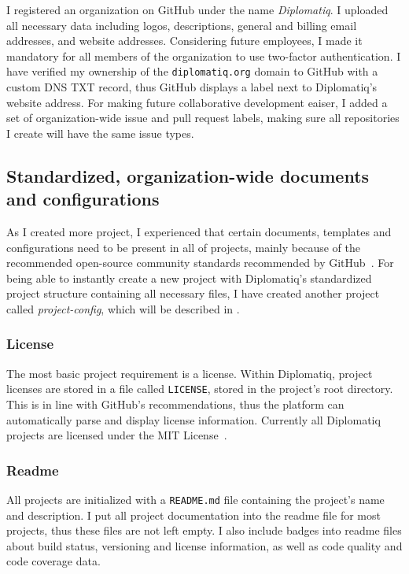 I registered an organization on GitHub under the name \emph{Diplomatiq}. I uploaded all necessary data including logos, descriptions, general and billing email addresses, and website addresses. Considering future employees, I made it mandatory for all members of the organization to use two-factor authentication. I have verified my ownership of the \lstinline{diplomatiq.org} domain to GitHub with a custom DNS TXT record, thus GitHub displays a  label next to Diplomatiq's website address. For making future collaborative development eaiser, I added a set of organization-wide issue and pull request labels, making sure all repositories I create will have the same issue types.

\subsection{Standardized, organization-wide documents and configurations}

As I created more project, I experienced that certain documents, templates and configurations need to be present in all of projects, mainly because of the recommended open-source community standards recommended by GitHub~\cite{opensource-guide}. For being able to instantly create a new project with Diplomatiq's standardized project structure containing all necessary files, I have created another project called \emph{project-config}, which will be described in .

\subsubsection{License}

The most basic project requirement is a license. Within Diplomatiq, project licenses are stored in a file called \lstinline{LICENSE}, stored in the project's root directory. This is in line with GitHub's recommendations, thus the platform can automatically parse and display license information. Currently all Diplomatiq projects are licensed under the MIT License~\cite{mit-license}.

\subsubsection{Readme}

All projects are initialized with a \lstinline{README.md} file containing the project's name and description. I put all project documentation into the readme file for most projects, thus these files are not left empty. I also include badges into readme files about build status, versioning and license information, as well as code quality and code coverage data.

